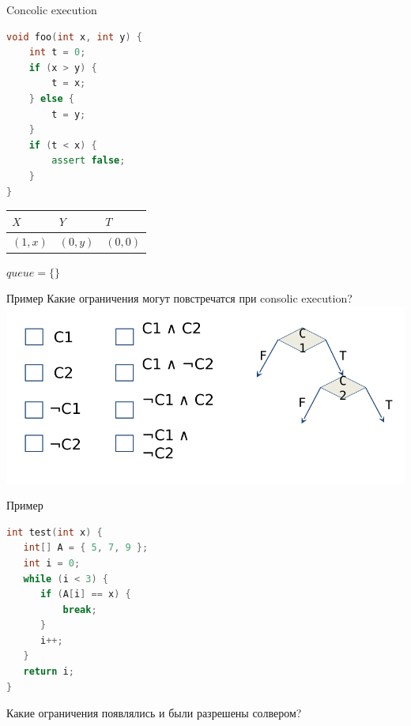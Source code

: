 \documentclass{beamer}
\begin{document}
\begin{frame}[fragile]{Concolic execution}
\begin{minipage}{0.49\textwidth}
\begin{lstlisting}[language=C++,escapechar=@]
void foo(int x, int y) {
    int t = 0;
    if (x > y) {
        t = x;
    } else {
        t = y;
    }
    if (t < x) {
        assert false;
    }
}
\end{lstlisting}
\end{minipage}
\hfill
\begin{minipage}{0.49\textwidth}
\begin{center}
\begin{tabular}{ | l | l | l | }
\hline
$X$ & $Y$ & $T$ \\
\hline
$(1, x)$ & $(0, y)$ & $(0, 0)$ \\
\hline
\end{tabular}
$queue = \{\}$
\end{center}
\end{minipage}
\end{frame}

\begin{frame}{Пример}
Какие ограничения могут повстречатся при consolic execution?
\includegraphics[scale=0.35]{quiz.png}
\end{frame}

\begin{frame}[fragile]{Пример}
\begin{minipage}{0.49\textwidth}
\begin{lstlisting}[language=C++]
int test(int x) {
   int[] A = { 5, 7, 9 };
   int i = 0;
   while (i < 3) {
      if (A[i] == x) {
          break;
      }
      i++;
   }
   return i;
}
\end{lstlisting}
\end{minipage}
\begin{minipage}{0.49\textwidth}
Какие ограничения появлялись и были разрешены солвером?
\end{minipage}
\end{frame}
\end{document}
